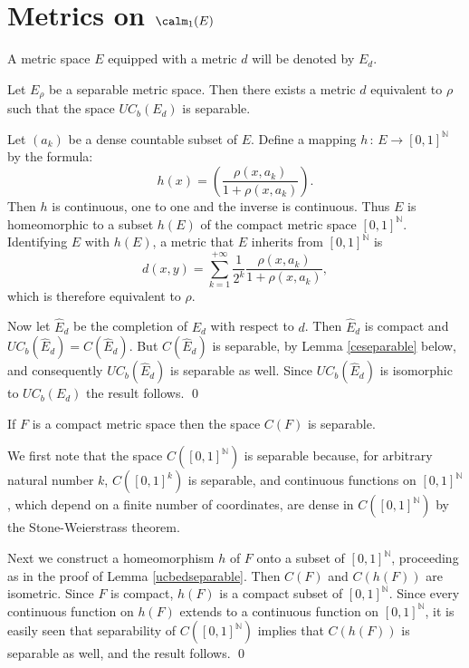 \documentclass[preprint]{imsart}
\def\N{\mathbb N}
\begin{document}
{\section{Metrics on $\calm_1(E)$}

A metric space $E$ equipped with a metric $d$ will be denoted by
$E_d$.

\begin{Lemma}\label{ucbedseparable}
Let $E_\rho$ be a separable metric space. Then
there exists a metric $d$ equivalent to $\rho$ such that
the space $UC_b(E_d)$ is separable.
\end{Lemma}


Let $(a_k)$ be a dense countable subset of $E$. Define
a mapping $h\, :\, E\to [0,1]^\N$ by the formula:
$$
h(x)=\left(\frac{\rho(x,a_k)}{1+\rho(x,a_k)}\right).
$$
Then $h$ is continuous,
one to one and the inverse is continuous.
Thus $E$  is homeomorphic to a subset  $h(E)$ of the compact
metric space $[0,1]^\N$. Identifying $E$ with $h(E)$,
a metric that $E$ inherits
from $[0,1]^\N$ is
$$
d(x,y)= \sum_{k=1}^{+\infty}\frac{1}{2^k}
\frac{\rho(x,a_k)}{1+\rho(x,a_k)},
$$
which is
therefore equivalent to $\rho$.

Now
let $\widehat{E}_d$ be the completion of $E_d$ with respect
to $d$. Then $\widehat{E}_d$ is compact and
$UC_b(\widehat{E}_d) = C(\widehat{E}_d)$.
But $C(\widehat{E}_d)$ is separable,
by Lemma \ref{ceseparable} below, and consequently
$UC_b(\widehat{E}_d)$ is separable as well.
Since $UC_b(\widehat{E}_d)$ is isomorphic to
$UC_b(E_d)$ the result follows. \qed


\begin{Lemma}\label{ceseparable}
If $F$ is a compact metric space then the space
$C(F)$ is separable.
\end{Lemma}

We first note that the space $C([0,1]^\N)$ is separable
because, for arbitrary natural number $k$,
$C([0,1]^k)$ is separable, and continuous functions
on $[0,1]^\N$, which depend on a finite number
of coordinates, are dense in $C([0,1]^\N)$
by the Stone-Weierstrass theorem.

Next we construct a homeomorphism $h$ of $F$ onto a
subset of $[0,1]^\N$, proceeding as in the proof of Lemma
\ref{ucbedseparable}. Then $C(F)$ and $C(h(F))$ are isometric.
Since $F$ is compact, $h(F)$ is a compact subset of
$[0,1]^\N$. Since every
continuous function on $h(F)$ extends
to a continuous function on $[0,1]^\N$,
it is easily seen that separability of
$C([0,1]^\N)$ implies that
$C(h(F))$ is separable as well, and the result follows.
\qed

}
\end{document}
